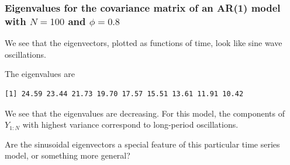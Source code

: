 \begin{frame}[fragile]

\frametitle{Eigenvalues for the covariance matrix of an AR(1) model with $N=100$ and $\phi=0.8$}

\bi
\item  We see that the eigenvectors, plotted as functions of time, look like sine wave oscillations.

\item  The eigenvalues are
\begin{knitrout}\small
{}\color{fgcolor}\begin{kframe}
\begin{alltt}
\hlopt{$}\hldef{values[}\hlopt{:}\hldef{],}\hldef{)}
\end{alltt}
\begin{verbatim}
[1] 24.59 23.44 21.73 19.70 17.57 15.51 13.61 11.91 10.42
\end{verbatim}
\end{kframe}
\end{knitrout}

\item  We see that the eigenvalues are decreasing. For this model, the components of $Y_{1:N}$ with highest variance correspond to long-period oscillations.

\item  Are the sinusoidal eigenvectors a special feature of this particular time series model, or something more general?

\ei

\end{frame}


